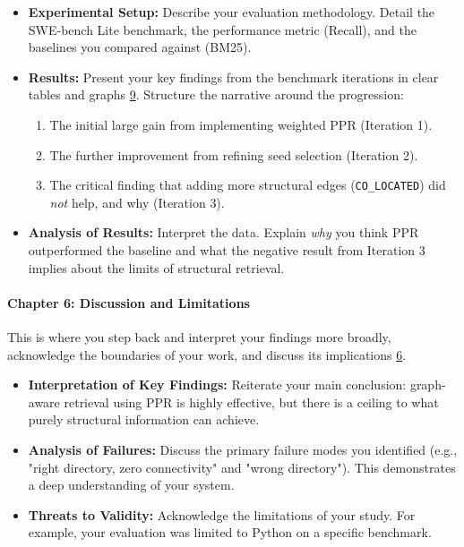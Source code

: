 \documentclass{article}
\begin{document}
\begin{itemize}
\item \textbf{Experimental Setup:} Describe your evaluation methodology. Detail the SWE-bench Lite benchmark, the performance metric (Recall), and the baselines you compared against (BM25).


\item \textbf{Results:} Present your key findings from the benchmark iterations in clear tables and graphs \hyperref[ref:9]{9}. Structure the narrative around the progression:

\begin{enumerate}
\item The initial large gain from implementing weighted PPR (Iteration 1).


\item The further improvement from refining seed selection (Iteration 2).


\item The critical finding that adding more structural edges (\texttt{CO\_LOCATED}) did \emph{not} help, and why (Iteration 3).


\end{enumerate}


\item \textbf{Analysis of Results:} Interpret the data. Explain \emph{why} you think PPR outperformed the baseline and what the negative result from Iteration 3 implies about the limits of structural retrieval.


\end{itemize}

\paragraph{\textbf{Chapter 6: Discussion and Limitations}}

This is where you step back and interpret your findings more broadly, acknowledge the boundaries of your work, and discuss its implications \hyperref[ref:6]{6}.

\begin{itemize}
\item \textbf{Interpretation of Key Findings:} Reiterate your main conclusion: graph-aware retrieval using PPR is highly effective, but there is a ceiling to what purely structural information can achieve.


\item \textbf{Analysis of Failures:} Discuss the primary failure modes you identified (e.g., "right directory, zero connectivity" and "wrong directory"). This demonstrates a deep understanding of your system.


\item \textbf{Threats to Validity:} Acknowledge the limitations of your study. For example, your evaluation was limited to Python on a specific benchmark.


\end{itemize}
\end{document}
